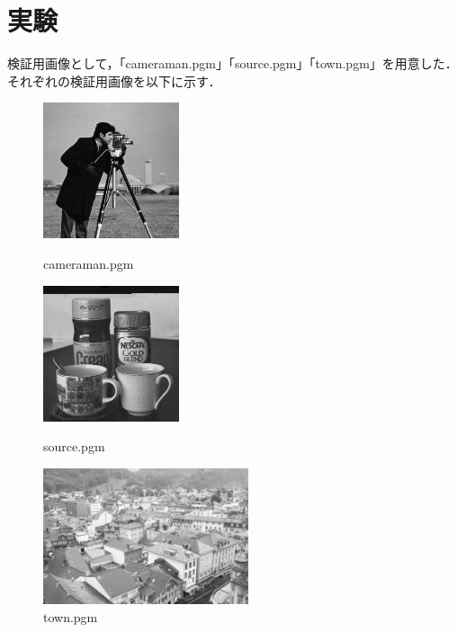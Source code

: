 \documentclass{jsarticle}
\begin{document}
\newpage

\section{実験}
検証用画像として，「cameraman.pgm」「source.pgm」「town.pgm」を用意した．\\
それぞれの検証用画像を以下に示す．

\begin{figure}[htbp]
 \begin{minipage}{0.33\hsize}
  \begin{center}
   \includegraphics[height=40mm]{cameraman.png}
  \end{center}
  \caption{cameraman.pgm}
  \label{fig:one}
 \end{minipage}
 \begin{minipage}{0.33\hsize}
  \begin{center}
   \includegraphics[height=40mm]{source.png}
  \end{center}
  \caption{source.pgm}
  \label{fig:two}
 \end{minipage}
 \begin{minipage}{0.33\hsize}
  \begin{center}
   \includegraphics[height=40mm]{town.png}
  \end{center}
  \caption{town.pgm}
  \label{fig:three}
 \end{minipage}
\end{figure}
\end{document}
